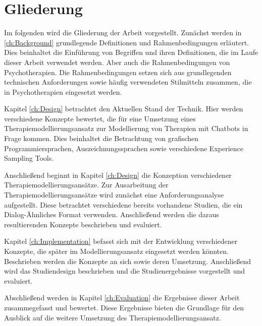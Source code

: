 
\section{Gliederung}

Im folgenden wird die Gliederung der Arbeit vorgestellt. Zunächst werden in \ref{ch:Background} grundlegende Definitionen und Rahmenbedingungen erläutert. Dies beinhaltet die Einführung von Begriffen und ihren Definitionen, die im Laufe dieser Arbeit verwendet werden. Aber auch die Rahmenbedingungen von Psychotherapien. Die Rahmenbedingungen setzen sich aus grundlegenden technischen Anforderungen sowie häufig verwendeten Stilmitteln zusammen, die in Psychotherapien eingesetzt werden.

Kapitel \ref{ch:Design} betrachtet den Aktuellen Stand der Technik. Hier werden verschiedene Konzepte bewertet, die für eine Umsetzung eines Therapiemodellierungsansatz zur Modellierung von Therapien mit Chatbots in Frage kommen. Dies beinhaltet die Betrachtung von grafischen Programmiersprachen, Auszeichnungssprachen sowie verschiedene Experience Sampling Tools.

Anschließend beginnt in Kapitel \ref{ch:Design} die Konzeption verschiedener Therapiemodellierungsansätze. Zur Ausarbeitung der Therapiemodellierungsansätze wird zunächst eine Anforderungsanalyse aufgestellt. Diese betrachtet verschiedene bereits vorhandene Studien, die ein Dialog-Ähnliches Format verwenden. Anschließend werden die daraus resultierenden Konzepte beschrieben und evaluiert.

Kapitel \ref{ch:Implementation} befasst sich mit der Entwicklung verschiedener Konzepte, die später im Modellierungsansatz eingesetzt werden könnten. Beschrieben werden die Konzepte an sich sowie deren Umsetzung. Anschließend wird das Studiendesign beschrieben und die Studienergebnisse vorgestellt und evaluiert. 

Abschließend werden in Kapitel \ref{ch:Evaluation} die Ergebnisse dieser Arbeit zusammegefasst und bewertet. Diese Ergebnisse bieten die Grundlage für den Ausblick auf die weitere Umsetzung des Therapiemodellierungsansatz.



